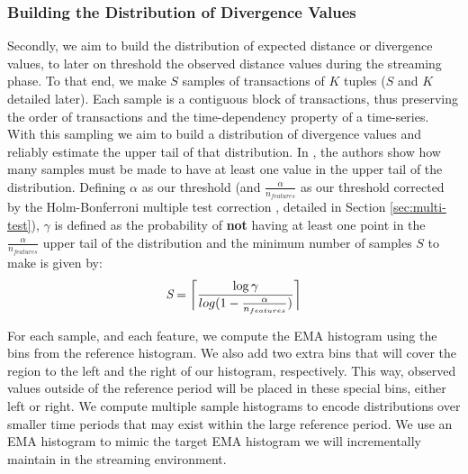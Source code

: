 \documentclass[sigconf]{acmart}
\DeclarePairedDelimiter{\ceil}{\lceil}{\rceil}
\begin{document}
\subsubsection{Building the Distribution of Divergence Values} \label{sec:sampling-batch}
Secondly, we aim to build the distribution of expected distance or divergence values, to later on threshold the observed distance values during the streaming phase. To that end, we make $S$ samples of transactions of $K$ tuples ($S$ and $K$ detailed later). Each sample is a contiguous block of transactions, thus preserving the order of transactions and the time-dependency property of a time-series. With this sampling we aim to build a distribution of divergence values and reliably estimate the upper tail of that distribution. In \cite{SAMM}, the authors show how many samples must be made to have at least one value in the upper tail of the distribution. Defining $\alpha$ as our threshold (and $\frac{\alpha}{n_{features}}$ as our threshold corrected by the Holm-Bonferroni multiple test correction \cite{HolmBonferroni}, detailed in Section \ref{sec:multi-test}), $\gamma$ is defined as the probability of \textbf{not} having at least one point in the $\frac{\alpha}{n_{features}}$ upper tail of the distribution and the minimum number of samples $S$ to make is given by:
\begin{equation*}
    \label{eq:optimal-n-samples}
    \textit{S} = \ceil[\bigg]{\frac{\log\gamma}{log(1 - \frac{\alpha}{n_{features}})}}
\end{equation*}

For each sample, and each feature, we compute the EMA histogram using the bins from the reference histogram. We also add two extra bins that will cover the region to the left and the right of our histogram, respectively. This way, observed values outside of the reference period will be placed in these special bins, either left or right. We compute multiple sample histograms to encode distributions over smaller time periods that may exist within the large reference period. We use an EMA histogram to mimic the target EMA histogram we will incrementally maintain in the streaming environment.
\end{document}
